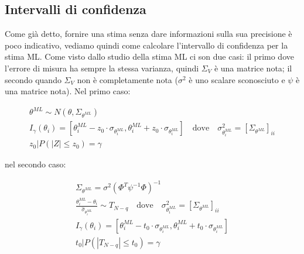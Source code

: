 \subsection{Intervalli di confidenza}
Come già detto, fornire una stima senza dare informazioni sulla sua precisione è poco indicativo, vediamo quindi come calcolare l'intervallo di confidenza per la stima ML. Come visto dallo studio della stima ML ci son due casi: il primo dove l'errore di misura ha sempre la stessa varianza, quindi $\Sigma_V$ è una matrice nota; il secondo quando $\Sigma_V$ non è completamente nota ($\sigma^2$ è uno scalare sconosciuto e $\psi$ è una matrice nota).
Nel primo caso:

\begin{gather*}
    \theta^{ML}\sim N(\theta,\Sigma_{\theta^{ML}})\\
    I_\gamma(\theta_i)=\left[ \theta_i^{ML} - z_0\cdot\sigma_{\theta_i^{ML}}  ,  \theta_i^{ML} + z_0\cdot\sigma_{\theta_i^{ML}}\right]\quad \text{dove} \quad \sigma_{\theta_i^{ML}}^2 = \left[ \Sigma_{\theta^{ML}}\right]_{ii}\\
    z_0 | P(\left| Z \right| \leq z_0 ) =\gamma
\end{gather*}

nel secondo caso:

\begin{gather*}
  \Sigma_{\theta^{ML}}=\sigma^2(\Phi^T\psi^{-1}\Phi)^{-1}\\
  \frac{\theta_i^{ML}-\theta_i}{\hat{\sigma}_{\theta_i^{ML}}} \sim T_{N-q}\quad\text{dove}\quad\sigma_{\theta_i^{ML}}^2 = \left[ \Sigma_{\theta^{ML}}\right]_{ii}\\
  I_\gamma(\theta_i)=\left[ \theta_i^{ML} - t_0\cdot\sigma_{\theta_i^{ML}}  ,  \theta_i^{ML} + t_0\cdot\sigma_{\theta_i^{ML}}\right]\\
  t_0 | P(\left| T_{N-q} \right| \leq t_0 ) =\gamma
\end{gather*}

